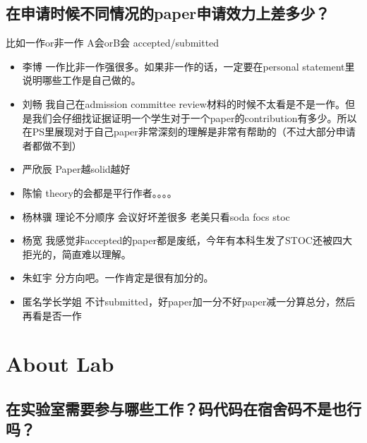 \documentclass{vivid_layout}
\begin{document}
\subsection{在申请时候不同情况的paper申请效力上差多少？}
比如一作or非一作 A会orB会 accepted/submitted
\begin{itemize}
\item  { 李博}  \quad 一作比非一作强很多。如果非一作的话，一定要在personal statement里说明哪些工作是自己做的。
\item  { 刘畅}  \quad 我自己在admission committee review材料的时候不太看是不是一作。但是我们会仔细找证据证明一个学生对于一个paper的contribution有多少。所以在PS里展现对于自己paper非常深刻的理解是非常有帮助的（不过大部分申请者都做不到）
\item  { 严欣辰}  \quad Paper越solid越好
\item  { 陈愉}  \quad theory的会都是平行作者。。。。
\item  { 杨林骥}  \quad 理论不分顺序 会议好坏差很多 老美只看soda focs stoc
\item  { 杨宽}  \quad 我感觉非accepted的paper都是废纸，今年有本科生发了STOC还被四大拒光的，简直难以理解。
\item  { 朱虹宇}  \quad 分方向吧。一作肯定是很有加分的。
\item {\name 匿名学长学姐}  \quad 不计submitted，好paper加一分不好paper减一分算总分，然后再看是否一作
\end{itemize}

\section{About Lab}
\addtocounter{section}{1}
\setcounter{subsection}{0}
\subsection{在实验室需要参与哪些工作？码代码在宿舍码不是也行吗？}
\end{document}
